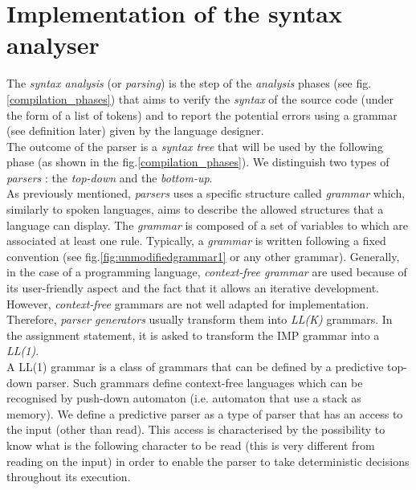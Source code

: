 \documentclass[a4paper,11pt]{article}
\begin{document}
\section{Implementation of the syntax analyser}
  The \textit{syntax analysis} (or \textit{parsing}) is the step of the \textit{analysis} phases (see fig.\ref{compilation_phases}) that aims to verify the \textit{syntax} of the source code (under the form of a list of tokens) and to report the potential errors using a grammar (see definition later) given by the language designer.\\
  The outcome of the parser is a \textit{syntax tree} that will be used by the following phase (as shown in the fig.\ref{compilation_phases}). We distinguish two types of \textit{parsers} : the \textit{top-down} and the \textit{bottom-up}.\\
  As previously mentioned, \textit{parsers} uses a specific structure called \textit{grammar} which, similarly to spoken languages, aims to describe the allowed structures that a language can display.
  The \textit{grammar} is composed of a set of variables to which are associated at least one rule. Typically, a \textit{grammar} is written following a fixed convention (see fig.\ref{fig:unmodifiedgrammar1} or any other grammar). Generally, in the case of a programming language, \textit{context-free grammar} are used because of its user-friendly aspect and the fact that it allows an iterative development. However, \textit{context-free} grammars are not well adapted for implementation. Therefore, \textit{parser generators} usually transform them into \textit{LL(K)} grammars. In the assignment statement, it is asked to transform the IMP grammar into a \textit{LL(1)}.\\
  A LL(1) grammar is a class of grammars that can be defined by a predictive top-down parser. Such grammars define context-free languages which can be recognised by push-down automaton (i.e. automaton that use a stack as memory). We define a predictive parser as a type of parser that has an access to the input (other than read). This access is characterised by the possibility to know what is the following character to be read (this is very different from reading on the input) in order to enable the parser to take deterministic decisions throughout its execution.
  
\end{document}

